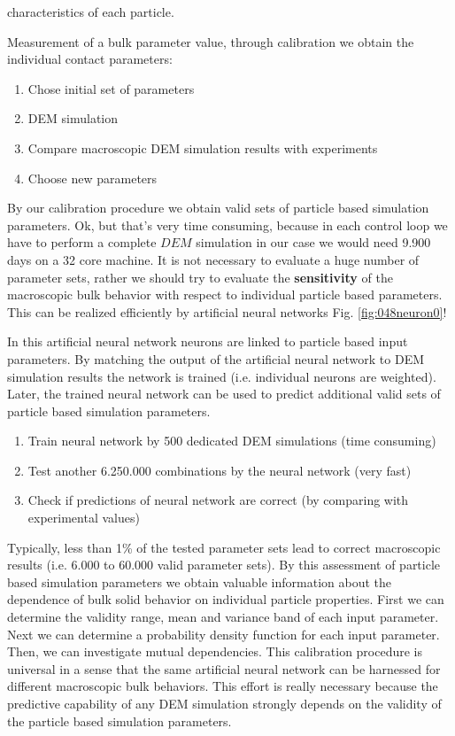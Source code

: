 characteristics of each particle.

Measurement of a bulk parameter value, through calibration we obtain the
individual contact parameters:
\begin{enumerate}
\item{Chose initial set of parameters}
\item{DEM simulation}
\item{Compare macroscopic DEM simulation results with experiments}
\item{Choose new parameters}
\end{enumerate}
By our calibration procedure we obtain valid sets of particle based simulation parameters.
Ok, but that's very time consuming, because in each control loop we have to
perform a complete $DEM$ simulation in our case we would need 9.900 days on a 32
core machine. It is not necessary to evaluate a huge number of parameter sets,
rather we should try to evaluate the \textbf{sensitivity} 
of the macroscopic bulk behavior with respect to individual particle based parameters.
This can be realized efficiently by artificial neural networks Fig.
\ref{fig:048neuron0}!

In this artificial neural network neurons are linked to particle based input parameters. 
By matching the output of the artificial neural network to DEM simulation results the network is trained 
(i.e. individual neurons are weighted).
Later, the trained neural network can be used to predict additional valid sets of particle based simulation parameters. 

\begin{enumerate}
\item{Train neural network by 500 dedicated DEM simulations (time consuming)}
\item{Test another 6.250.000 combinations by the neural network (very fast)}
\item{Check if predictions of neural network are correct (by comparing with experimental  values)}
\end{enumerate}

Typically, less than 1\% of the tested parameter sets lead to correct
macroscopic results (i.e. 6.000 to 60.000 valid parameter sets).
By this assessment of particle based simulation parameters we obtain valuable information about the dependence 
of bulk solid behavior on individual particle properties.
First we can determine the validity range, mean and variance band of each input
parameter. Next we can determine a probability density function for each input
parameter. Then, we can investigate mutual dependencies.
This calibration procedure is universal in a sense that the same artificial neural network can be harnessed for 
different macroscopic bulk behaviors.
This effort is really necessary because the predictive capability of any DEM simulation strongly 
depends on the validity of the particle 
based simulation parameters.
